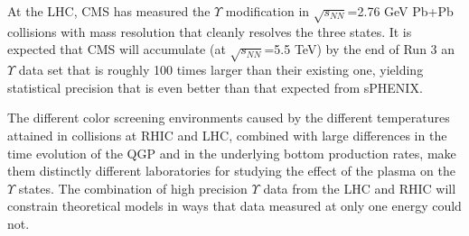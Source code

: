 At the LHC, CMS has measured the $\Upsilon$ modification in $\sqrt{s_{NN}}$=2.76 GeV Pb+Pb
collisions with mass resolution that cleanly resolves the three states. It is expected that CMS will 
accumulate (at $\sqrt{s_{NN}}$=5.5 TeV) by the end of Run 3 an $\Upsilon$ data set that is roughly 
100 times larger than their existing one, yielding statistical precision that is even better than that expected 
from sPHENIX. 

The different color screening environments caused by the different temperatures attained in collisions at RHIC 
and LHC, combined with large differences in the time evolution of the QGP and in the underlying bottom
production rates, make them distinctly different laboratories for studying the effect of the plasma on the 
$\Upsilon$ states. The combination of high precision $\Upsilon$ data from the LHC and RHIC will 
constrain theoretical models in ways that data measured at only one energy could not.